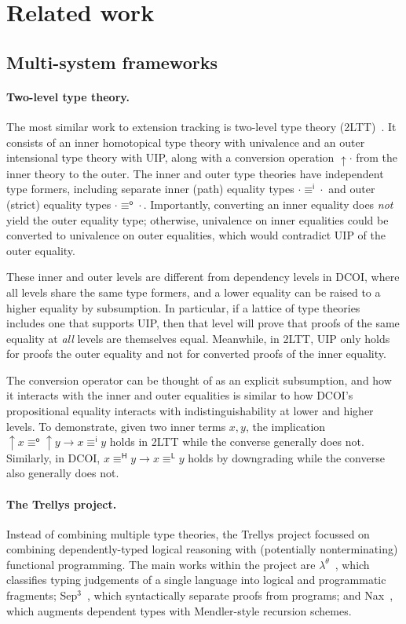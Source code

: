 \documentclass{article}
\newcommand{\HH}{\mathsf{H}}
\newcommand{\LL}{\mathsf{L}}
\newcommand{\oo}{\mathsf{o}}
\newcommand{\ii}{\mathsf{i}}
\begin{document}
\section{Related work} \label{sec:related}

\subsection{Multi-system frameworks}

\paragraph{Two-level type theory.}
The most similar work to extension tracking is two-level type theory (2LTT)~\citep{2ltt}.
It consists of an inner homotopical type theory with univalence
and an outer intensional type theory with UIP,
along with a conversion operation $\mathop{\uparrow} \cdot$ from the inner theory to the outer.
The inner and outer type theories have independent type formers,
including separate inner (path) equality types $\cdot \equiv^\ii \cdot$
and outer (strict) equality types $\cdot \equiv^\oo \cdot$.
Importantly, converting an inner equality does \emph{not} yield the outer equality type;
otherwise, univalence on inner equalities could be converted to univalence on outer equalities,
which would contradict UIP of the outer equality.

These inner and outer levels are different from dependency levels in DCOI,
where all levels share the same type formers,
and a lower equality can be raised to a higher equality by subsumption.
In particular, if a lattice of type theories includes one that supports UIP,
then that level will prove that proofs of the same equality at \emph{all} levels are themselves equal.
Meanwhile, in 2LTT, UIP only holds for proofs the outer equality
and not for converted proofs of the inner equality.

The conversion operator can be thought of as an explicit subsumption,
and how it interacts with the inner and outer equalities
is similar to how DCOI's propositional equality interacts with indistinguishability
at lower and higher levels.
To demonstrate, given two inner terms $x, y$,
the implication $\mathop{\uparrow} x \equiv^\oo \mathop{\uparrow} y \to x \equiv^\ii y$
holds in 2LTT while the converse generally does not.
Similarly, in DCOI, $x \equiv^\HH y \to x \equiv^\LL y$ holds by downgrading
while the converse also generally does not.

\paragraph{The Trellys project.}
Instead of combining multiple type theories,
the Trellys project focussed on combining dependently-typed logical reasoning
with (potentially nonterminating) functional programming.
The main works within the project are $\lambda^\theta$~\citep{lambda-theta},
which classifies typing judgements of a single language into logical and programmatic fragments;
Sep$^3$~\citep{sep3}, which syntactically separate proofs from programs;
and Nax~\citep{nax}, which augments dependent types with Mendler-style recursion schemes.
\end{document}
